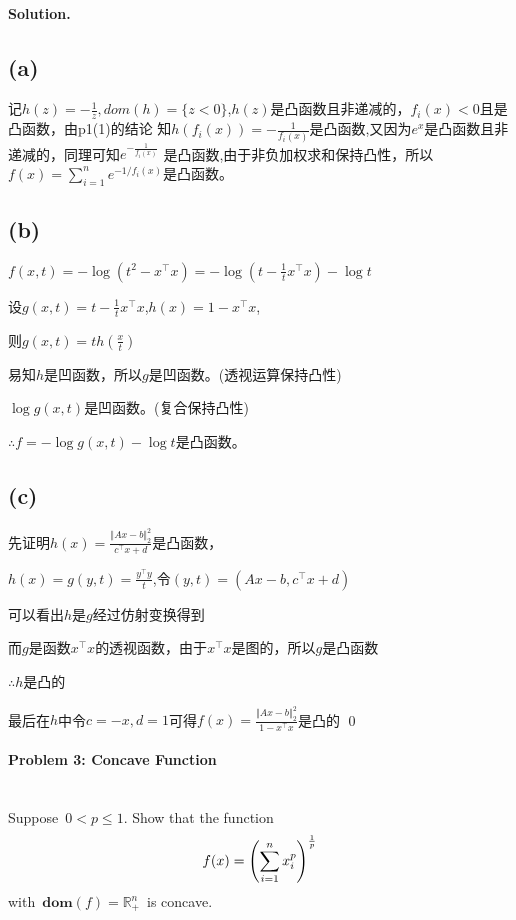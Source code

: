 \documentclass[a4paper]{article}
\newenvironment{solution}
{\color{blue} \paragraph{Solution.}}
{\newline \qed}
\begin{document}
\newpage
\begin{solution}
\subsection*{(a)}
记$h(z)=-\frac{1}{z}, dom(h)=\{z<0\}$,$h(z)$是凸函数且非递减的，$f_i(x)<0$且是凸函数，由p1(1)的结论
知$h(f_i(x))=-\frac{1}{f_i(x)}$是凸函数,又因为$e^x$是凸函数且非递减的，同理可知$e^{-\frac{1}{f_i(x)}}$
是凸函数,由于非负加权求和保持凸性，所以$f(x) = \sum^n_{i=1} e^{-1/f_i(x)}$是凸函数。
\subsection*{(b)}
$f(x,t) = -\log(t^2-x^{\top}x)=-\log(t-\frac{1}{t}x^{\top}x)-\log t$

设$g(x,t)=t-\frac{1}{t}x^{\top}x$,$h(x)=1-x^{\top}x$,

则$g(x,t)=th(\frac{x}{t})$

易知$h$是凹函数，所以$g$是凹函数。(透视运算保持凸性)

$\log g(x,t)$是凹函数。(复合保持凸性)

$\therefore f = -\log g(x,t)-\log t$是凸函数。

\subsection*{(c)}
先证明$h(x)=\frac{\Vert Ax-b\Vert^2_2}{c^{\top}x+d}$是凸函数，

$h(x)=g(y,t)=\frac{y^{\top}y}{t}$,令$(y,t)=(Ax-b,c^{\top}x+d)$

可以看出$h$是$g$经过仿射变换得到

而$g$是函数$x^{\top}x$的透视函数，由于$x^{\top}x$是图的，所以$g$是凸函数

$\therefore h$是凸的

最后在$h$中令$c=-x, d=1$可得$f(x)=\frac{\Vert Ax-b\Vert^2_2}{1-x^{\top}x}$是凸的
\end{solution}


\paragraph{Problem 3: Concave Function}
~\\

\noindent
Suppose~$0<p\le 1$. Show that the function
\begin{equation}
f(x) = \left( \sum^n_{i=1} x^p_i \right)^{\frac{1}{p}} \notag
\end{equation}
with~$\textbf{dom}(f) = \mathbb{R}^n_{+}$~is concave.
\end{document}
